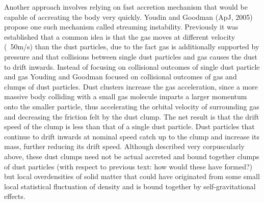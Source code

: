 \documentclass[12pt,letterpaper]{article}
\begin{document}
Another approach involves relying on fast accretion mechanism that would be capable of accreating the body very quickly. Youdin and Goodman (ApJ, 2005) propose one such mechanism called streaming instability. Previously it was established that a common idea is that the gas moves at different velocity (~50m/s) than the dust particles, due to the fact gas is additionally supported by pressure and that collisions between single dust particles and gas causes the dust to drift inwards. Instead of focusing on collisional outcomes of single dust particle and gas Youding and Goodman focused on collisional outcomes of gas and clumps of dust particles. Dust clusters increase the gas acceleration, since a more massive body colliding with a small gas molecule imparts a larger momentum onto the smaller particle, thus accelerating the orbital velocity of surrounding gas and decreasing the friction felt by the dust clump. The net result is that the drift speed of the clump is less than that of a single dust particle. Dust particles that continue to drift inwards at nominal speed catch up to the clump and increase its mass, further reducing its drift speed. Although described very corpuscularly above, these dust clumps need not be actual accreted and bound together clumps of dust particles (with respect to previous text: how would these have formed?) but local overdensities of solid matter that could have originated from some small local statistical fluctuation of density and is bound together by self-gravitational effects. 



 
   
\end{document}
